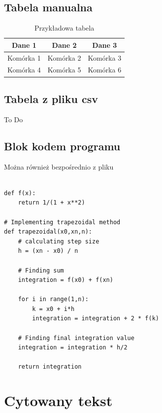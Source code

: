 \documentclass[11pt]{extreport}
\begin{document}
\subsection{Tabela manualna}

\begin{table}[ht]
\centering			          %
\caption{Przykładowa tabela}  %
\label{tab:przyklad}		  %
\begin{tabular}{|c|c|c|}      %
\hline					      %
Dane 1 & Dane 2 & Dane 3 \\
\hline                                 %
Komórka 1 & Komórka 2 & Komórka 3 \\  %
\hline
Komórka 4 & Komórka 5 & Komórka 6 \\  %
\hline
\end{tabular}
\end{table}

\subsection{Tabela z pliku csv}
To Do

\subsection{Blok kodem programu }
Można również bezpośrednio z pliku %
\begin{verbatim}

def f(x):
    return 1/(1 + x**2)

# Implementing trapezoidal method
def trapezoidal(x0,xn,n):
    # calculating step size
    h = (xn - x0) / n
    
    # Finding sum 
    integration = f(x0) + f(xn)
    
    for i in range(1,n):
        k = x0 + i*h
        integration = integration + 2 * f(k)
    
    # Finding final integration value
    integration = integration * h/2
    
    return integration
\end{verbatim}

\section{Cytowany tekst }
\end{document}
